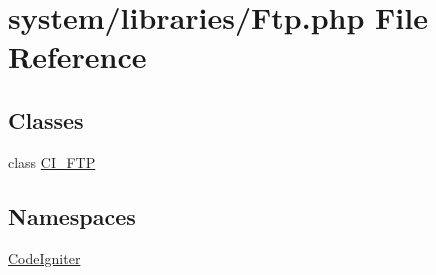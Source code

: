\hypertarget{_ftp_8php}{}\section{system/libraries/\+Ftp.php File Reference}
\label{_ftp_8php}
\subsection*{Classes}
\begin{DoxyCompactItemize}
\item 
class \mbox{\hyperlink{class_c_i___f_t_p}{C\+I\+\_\+\+F\+TP}}
\end{DoxyCompactItemize}
\subsection*{Namespaces}
\begin{DoxyCompactItemize}
\item 
 \mbox{\hyperlink{namespace_code_igniter}{Code\+Igniter}}
\end{DoxyCompactItemize}
